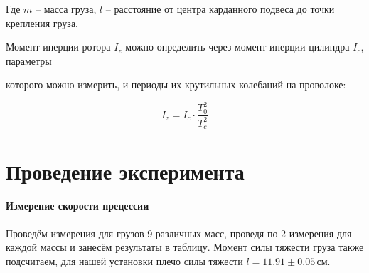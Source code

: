 \documentclass[12pt,a4paper]{scrartcl}
\begin{document}
	Где $m$ -- масса груза, $l$ -- расстояние от центра карданного подвеса до точки крепления груза.
	
	Момент инерции ротора $I_z$ можно определить через момент инерции цилиндра $I_c$, параметры \par которого можно измерить, и периоды их крутильных колебаний на проволоке:
	
	\begin{equation}
		I_z  = I_{c} \cdot \frac{T_0^2}{T_{c}^2}
	\end{equation}
	
	\section{Проведение эксперимента}
	\paragraph{Измерение скорости прецессии} \hfill
	\par Проведём измерения для грузов 9 различных масс, проведя по 2 измерения для каждой массы и занесём результаты в таблицу. Момент силы тяжести груза также подсчитаем, для нашей установки плечо силы тяжести $l = 11.91 \pm 0.05\,\text{см}$.
	
\end{document}

